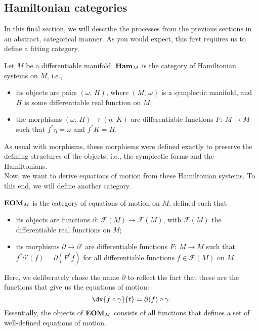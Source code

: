 \documentclass{article}
\newcommand{\category}[1]{{\normalfont\textbf{#1}}}
\begin{document}
\begin{multicols}{2}
	\section{Hamiltonian categories}
	In this final section, we will describe the processes from the previous sections in an abstract, categorical manner. As you would expect, this first requires us to define a fitting category.
	\begin{definition}
		Let \(M\) be a differentiable manifold. \(\category{Ham}_M\) is the category of Hamiltonian systems on \(M\), i.e.,
		\begin{itemize}
			\item its objects are pairs \((\omega,\,H)\), where \((M,\,\omega)\) is a symplectic manifold, and \(H\) is some differentiable real function on \(M\);
			\item the morphisms \((\omega,\,H) \to (\eta,\,K)\) are differentiable functions \(F:\ M\to M\) such that \(f^*\eta = \omega\) and \(f^*K = H\).
		\end{itemize}
	\end{definition}
	As usual with morphisms, these morphisms were defined exactly to preserve the defining structures of the objects, i.e., the symplectic forms and the Hamiltonians.\\
	Now, we want to derive equations of motion from these Hamiltonian systems. To this end, we will define another category.
	\begin{definition}
		\(\category{EOM}_M\) is the category of equations of motion on \(M\), defined such that
		\begin{itemize}
			\item its objects are functions \(\partial:\ \mathcal{F}(M)\to \mathcal{F}(M)\), with \(\mathcal{F}(M)\) the differentiable real functions on \(M\);
			\item its morphisms \(\partial \to \partial'\) are differentiable functions \(F:\ M\to M\) such that \(f^*\partial'(f) = \partial(F^*f)\) for all differentiable functions \(f\in\mathcal{F}(M)\) on \(M\).
		\end{itemize}
	\end{definition}
	Here, we deliberately chose the name \(\partial\) to reflect the fact that these are the functions that give us the equations of motion:
	\begin{equation}
		\dv{f\circ\gamma}{t} = \partial(f)\circ\gamma.
	\end{equation}
	Essentially, the objects of \(\category{EOM}_M\) consists of all functions that defines a set of well-defined equations of motion.\\

\end{multicols}
\end{document}
